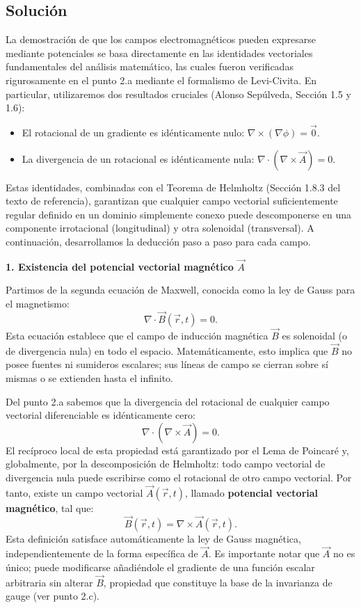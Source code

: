 \documentclass[a4paper]{article}
\begin{document}
\subsection{Solución}
La demostración de que los campos electromagnéticos pueden expresarse mediante potenciales se basa directamente en las identidades vectoriales fundamentales del análisis matemático, las cuales fueron verificadas rigurosamente en el punto 2.a mediante el formalismo de Levi-Civita. En particular, utilizaremos dos resultados cruciales (Alonso Sepúlveda, Sección 1.5 y 1.6):
\begin{itemize}
\item El rotacional de un gradiente es idénticamente nulo: $\nabla \times (\nabla \phi) = \vec{0}$.
\item La divergencia de un rotacional es idénticamente nula: $\nabla \cdot (\nabla \times \vec{A}) = 0$.
\end{itemize}
Estas identidades, combinadas con el Teorema de Helmholtz (Sección 1.8.3 del texto de referencia), garantizan que cualquier campo vectorial suficientemente regular definido en un dominio simplemente conexo puede descomponerse en una componente irrotacional (longitudinal) y otra solenoidal (transversal). A continuación, desarrollamos la deducción paso a paso para cada campo.

\vspace{0.3cm}
\noindent\textbf{1. Existencia del potencial vectorial magnético $\vec{A}$}

Partimos de la segunda ecuación de Maxwell, conocida como la ley de Gauss para el magnetismo:
$$
\nabla \cdot \vec{B}(\vec{r},t) = 0.
$$
Esta ecuación establece que el campo de inducción magnética $\vec{B}$ es solenoidal (o de divergencia nula) en todo el espacio. Matemáticamente, esto implica que $\vec{B}$ no posee fuentes ni sumideros escalares; sus líneas de campo se cierran sobre sí mismas o se extienden hasta el infinito.

Del punto 2.a sabemos que la divergencia del rotacional de cualquier campo vectorial diferenciable es idénticamente cero:
$$
\nabla \cdot (\nabla \times \vec{A}) = 0.
$$
El recíproco local de esta propiedad está garantizado por el Lema de Poincaré y, globalmente, por la descomposición de Helmholtz: todo campo vectorial de divergencia nula puede escribirse como el rotacional de otro campo vectorial. Por tanto, existe un campo vectorial $\vec{A}(\vec{r},t)$, llamado \textbf{potencial vectorial magnético}, tal que:
$$
\vec{B}(\vec{r},t) = \nabla \times \vec{A}(\vec{r},t).
$$
Esta definición satisface automáticamente la ley de Gauss magnética, independientemente de la forma específica de $\vec{A}$. Es importante notar que $\vec{A}$ no es único; puede modificarse añadiéndole el gradiente de una función escalar arbitraria sin alterar $\vec{B}$, propiedad que constituye la base de la invarianza de gauge (ver punto 2.c).
\end{document}

